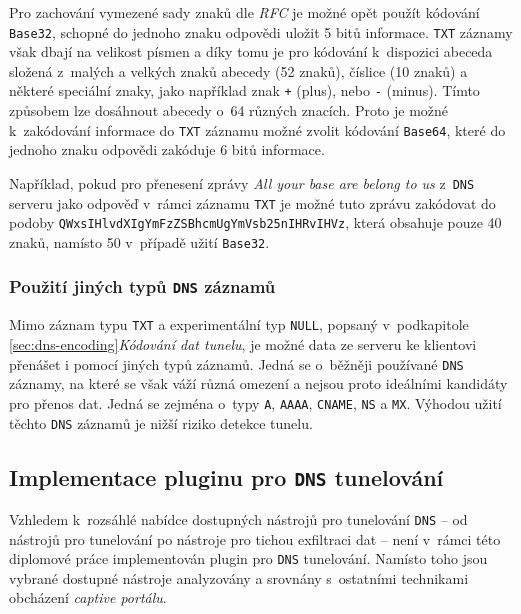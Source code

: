 \documentclass[thesis=M,czech]{FITthesis}[2012/10/20]
\begin{document}
    Pro zachování vymezené sady znaků dle \textit{RFC} je možné opět použít kódování \texttt{Base32}, schopné do jednoho znaku odpovědi uložit 5 bitů informace. \texttt{TXT} záznamy však dbají na velikost písmen a díky tomu je pro kódování k~dispozici abeceda složená z~malých a velkých znaků abecedy (52 znaků), číslice (10 znaků) a některé speciální znaky, jako například znak \texttt{+} (plus), nebo \texttt{-} (minus). Tímto způsobem lze dosáhnout abecedy o~64 různých znacích. Proto je možné k~zakódování informace do \texttt{TXT} záznamu možné zvolit kódování \texttt{Base64}, které do jednoho znaku odpovědi zakóduje 6 bitů informace.
    
    Například, pokud pro přenesení zprávy \textit{All your base are belong to us} z~\texttt{DNS} serveru jako odpověď v~rámci záznamu \texttt{TXT} je možné tuto zprávu zakódovat do podoby \texttt{QWxsIHlvdXIgYmFzZSBhcmUgYmVsb25nIHRvIHVz}, která obsahuje pouze 40 znaků, namísto 50 v~případě užití \texttt{Base32}.
    
    
    \subsubsection{Použití jiných typů \texttt{DNS} záznamů}
    
    Mimo záznam typu \texttt{TXT} a experimentální typ \texttt{NULL}, popsaný v~podkapitole \ref{sec:dns-encoding}\textit{Kódování dat tunelu}, je možné data ze serveru ke klientovi přenášet i pomocí jiných typů záznamů. Jedná se o~běžněji používané \texttt{DNS} záznamy, na které se však váží různá omezení a nejsou proto ideálními kandidáty pro přenos dat. Jedná se zejména o~typy \texttt{A}, \texttt{AAAA}, \texttt{CNAME}, \texttt{NS} a \texttt{MX}. Výhodou užití těchto \texttt{DNS} záznamů je nižší riziko detekce tunelu.
    
    
    \subsection{Implementace pluginu pro \texttt{DNS} tunelování}
    
    Vzhledem k~rozsáhlé nabídce dostupných nástrojů pro tunelování \texttt{DNS} -- od nástrojů pro tunelování po nástroje pro tichou exfiltraci dat -- není v~rámci této diplomové práce implementován plugin pro \texttt{DNS} tunelování. Namísto toho jsou vybrané dostupné nástroje analyzovány a srovnány s~ostatními technikami obcházení \textit{captive portálu}.

    
    
\end{document}
